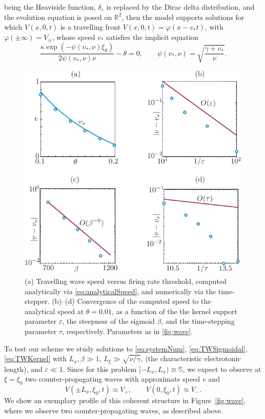 \documentclass[a4paper,final]{siamart190516}
\newcommand{\Rb}{\mathbb{R}}
\newcommand{\ep}{\varepsilon}
\begin{document}
being the Heaviside
function, $\delta_\ep$ is replaced by the Dirac delta distribution, and the
evolution equation is posed on $\Rb^2$, then the model supports solutions for which
$V(x,0,t)$ is a travelling front 
$
V(x,0,t) = \varphi(x-v_*t)$, 
with
$\varphi(\pm \infty) = V_\pm$,
whose speed $v_*$ satisfies the implicit equation~\cite{Ross2019}
\begin{equation}\label{eq:analyticalSpeed}
  \frac{\kappa \exp(-\psi(v_*,\nu) \xi_0 )}{2 \psi(v_*,\nu) \nu} -\theta = 0,
  \qquad \psi(v_*,\nu) = \sqrt{\frac{\gamma + v_*}{\nu}}.
\end{equation}
\begin{figure}
  \centering
  \includegraphics{convergenceTests}
  \caption{(a) Travelling wave speed versus firing rate
    threshold, computed analytically via \eqref{eq:analyticalSpeed}, and numerically
    via the time-stepper. (b)--(d) Convergence of the computed speed to the
    analytical speed at $\theta = 0.01$, as a function of the the kernel support
    parameter $\ep$, the steepness of the sigmoid $\beta$, and the time-stepping
    parameter $\tau$, respectively. Parameters as in \eqref{fig:wave}.}
    \label{fig:convergenceTests}
\end{figure}

To test our scheme we study solutions to \eqref{eq:systemNum},
\eqref{eq:TWSigmoidal}, \eqref{eq:TWKernel} with
$L_x, \beta \gg 1$, $L_\xi \gg \sqrt{\nu /\gamma}$,  (the
characteristic electrotonic length), and $\ep \ll 1$.
Since for this problem $[-L_x,L_x)
\cong \mathbb{S}$, we expect to observe at $\xi=\xi_0$
two counter-propagating waves with approximate speed $v$ and 
\[
  V(\pm L_x,\xi_0,t) \approx V_+, \qquad V(0,\xi_0,t) \approx V_-.
\]
We show an exemplary profile of this coherent structure in Figure~\ref{fig:wave},
where we observe two counter-propagating waves, as described above. 
\end{document}
